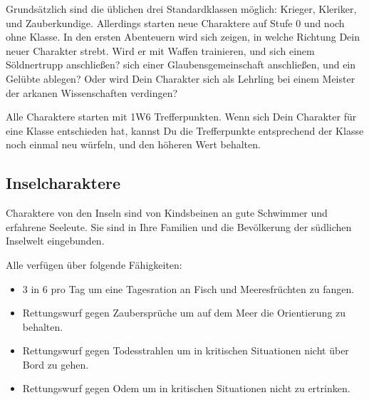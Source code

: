 \documentclass[11pt]{wbzine}
\begin{document}
\begin{multicols}{2}
Grundsätzlich sind die üblichen drei Standardklassen möglich:
Krieger, Kleriker, und Zauberkundige. Allerdings starten neue
Charaktere auf Stufe 0 und noch ohne Klasse. In den ersten
Abenteuern wird sich zeigen, in welche Richtung Dein neuer Charakter
strebt. Wird er mit Waffen trainieren, und sich einem Söldnertrupp
anschließen? sich einer Glaubensgemeinschaft anschließen, und ein
Gelübte ablegen? Oder wird Dein Charakter sich als Lehrling bei
einem Meister der arkanen Wissenschaften verdingen?

Alle Charaktere starten mit 1W6 Trefferpunkten. Wenn sich Dein
Charakter für eine Klasse entschieden hat, kannst Du die
Trefferpunkte entsprechend der Klasse noch einmal neu würfeln, und
den höheren Wert behalten.

\subsection{Inselcharaktere}

Charaktere von den Inseln sind von Kindsbeinen an gute Schwimmer
und erfahrene Seeleute. Sie sind in Ihre Familien und die
Bevölkerung der südlichen Inselwelt eingebunden.

Alle verfügen über folgende Fähigkeiten:

\begin{itemize}
    \item 3 in 6 pro Tag um eine Tagesration an Fisch und Meeresfrüchten zu
fangen.

\item Rettungswurf gegen Zaubersprüche um auf dem Meer die Orientierung
zu behalten.

\item Rettungswurf gegen Todesstrahlen um in kritischen Situationen
nicht über Bord zu gehen.

\item Rettungswurf gegen Odem um in kritischen Situationen nicht zu
ertrinken.
\end{itemize}


\end{multicols}
\end{document}
